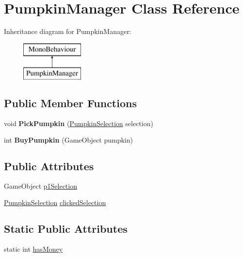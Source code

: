 \hypertarget{class_pumpkin_manager}{}\section{Pumpkin\+Manager Class Reference}
\label{class_pumpkin_manager}
Inheritance diagram for Pumpkin\+Manager\+:\begin{figure}[H]
\begin{center}
\leavevmode
\includegraphics[height=2.000000cm]{class_pumpkin_manager}
\end{center}
\end{figure}
\subsection*{Public Member Functions}
\begin{DoxyCompactItemize}
\item 
\mbox{\label{class_pumpkin_manager_a632fd636607c8067c0ebd5cdf747ccf2}} 
void {\bfseries Pick\+Pumpkin} (\hyperlink{class_pumpkin_selection}{Pumpkin\+Selection} selection)
\item 
\mbox{\label{class_pumpkin_manager_ab71217876313a82259997c561979126c}} 
int {\bfseries Buy\+Pumpkin} (Game\+Object pumpkin)
\end{DoxyCompactItemize}
\subsection*{Public Attributes}
\begin{DoxyCompactItemize}
\item 
Game\+Object \hyperlink{class_pumpkin_manager_aa64ea8a9e81650b43409b291f9bd5e20}{p1\+Selection}
\item 
\hyperlink{class_pumpkin_selection}{Pumpkin\+Selection} \hyperlink{class_pumpkin_manager_ab4437ea939dfb4ec5c00c35b7962209c}{clicked\+Selection}
\end{DoxyCompactItemize}
\subsection*{Static Public Attributes}
\begin{DoxyCompactItemize}
\item 
static int \hyperlink{class_pumpkin_manager_a4286037e6502dd8f5b9d9ef22b513bb9}{has\+Money}
\end{DoxyCompactItemize}


